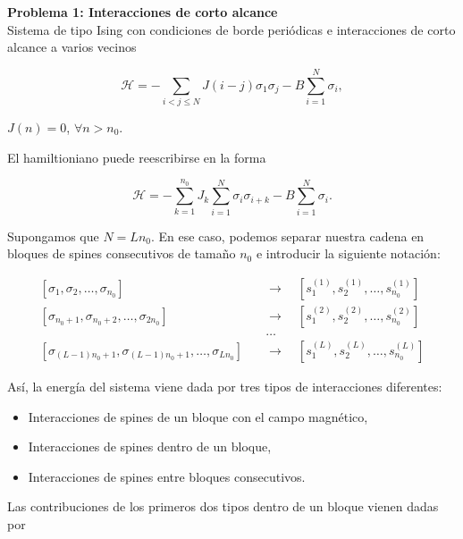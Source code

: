 \documentclass[10pt]{article}
\begin{document}
\textbf{Problema 1: Interacciones de corto alcance}
\\

Sistema de tipo Ising con condiciones de borde peri\'odicas e interacciones de corto alcance a varios vecinos

\begin{equation}
\mathcal{H} = - \sum_{i<j\leq N} J(i-j) \sigma_1 \sigma_j -  B \sum_{i=1}^N \sigma_i,
\end{equation}

$J(n) = 0$, $\forall n>n_0$.

El hamiltioniano puede reescribirse en la forma 

\begin{equation}
\mathcal{H} = -\sum_{k=1}^{n_0} J_k \sum_{i=1}^N \sigma_i \sigma_{i+k} - B \sum_{i=1}^N \sigma_i.
\end{equation}

Supongamos que $N = L n_0$. En ese caso, podemos separar nuestra cadena en bloques de spines consecutivos de tama\~no $n_0$ e introducir la siguiente notaci\'on:

\begin{align*}
\left[ \sigma_1, \sigma_2,\dots ,\sigma_{n_0} \right]
\quad &\rightarrow\quad
\left[ s_1^{(1)}, s_2^{(1)},\dots ,s_{n_0}^{(1)} \right]  \\
\left[ \sigma_{n_0+1},\sigma_{n_0+2},\dots ,\sigma_{2n_0} \right]
\quad &\rightarrow\quad
\left[ s_1^{(2)}, s_2^{(2)},\dots ,s_{n_0}^{(2)} \right] \\
&\dots  \\
\left[ \sigma_{(L-1)n_0+1}, \sigma_{(L-1)n_0+1},\dots ,\sigma_{L n_0} \right] 
\quad &\rightarrow\quad
\left[ s_1^{(L)}, s_2^{(L)},\dots ,s_{n_0}^{(L)} \right]
\end{align*}

As\'i, la energ\'ia del sistema viene dada por tres tipos de interacciones diferentes:

\begin{itemize}
\item Interacciones de spines de un bloque con el campo magn\'etico, \\
\item Interacciones de spines dentro de un bloque, \\
\item Interacciones de spines entre bloques consecutivos.
\end{itemize}

Las contribuciones de los primeros dos tipos dentro de un bloque vienen dadas por 
\end{document}
